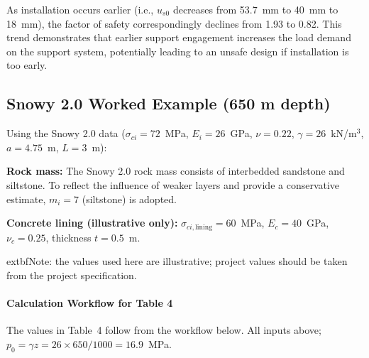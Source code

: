 As installation occurs earlier (i.e., $u_{s0}$ decreases from 53.7~mm to 40~mm to 18~mm), the factor of safety correspondingly declines from 1.93 to 0.82. This trend demonstrates that earlier support engagement increases the load demand on the support system, potentially leading to an unsafe design if installation is too early.

\subsection{Snowy 2.0 Worked Example (650 m depth)}
\label{sec:ch07-worked-example}

Using the Snowy 2.0 data ($\sigma_{ci}=72$~MPa, $E_i=26$~GPa, $\nu = 0.22$, $\gamma=26$~kN/m$^3$, $a=4.75$~m, $L=3$~m):

\begin{notebox}
\textbf{Rock mass:} The Snowy 2.0 rock mass consists of interbedded sandstone and siltstone. To reflect the influence of weaker layers and provide a conservative estimate, $m_i = 7$ (siltstone) is adopted.
\vspace{0.5em}

\textbf{Concrete lining (illustrative only):} $\sigma_{ci,\text{lining}} = 60$~MPa, $E_c = 40$~GPa, $\nu_c = 0.25$, thickness $t = 0.5$~m.
\vspace{0.5em}

	extbf{Note:} the values used here are illustrative; project values should be taken from the project specification.
\end{notebox}

\paragraph{Calculation Workflow for Table 4}

The values in Table~4 follow from the workflow below. All inputs above; $p_0 = \gamma z = 26 \times 650/1000 = 16.9$~MPa.

